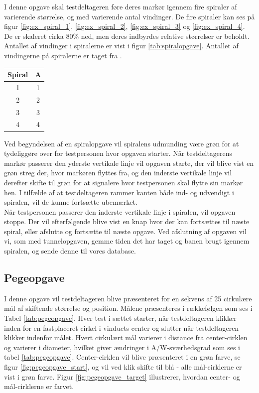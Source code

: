 I denne opgave skal testdeltageren føre deres markør igennem fire spiraler af varierende størrelse, og med varierende antal vindinger. De fire spiraler kan ses på figur \ref{fig:ex_spiral_1}, \ref{fig:ex_spiral_2}, \ref{fig:ex_spiral_3} og \ref{fig:ex_spiral_4}. De er skaleret cirka 80\% ned, men deres indbyrdes relative størrelser er beholdt. Antallet af vindinger i spiralerne er vist i figur \ref{tab:spiralopgave}. Antallet af vindingerne på spiralerne er taget fra \cite{accot1997}.
\begin{center}
	\begin{tabular}{c c}
		Spiral & A \\
		\hline
		1 & 1 \\
		2 & 2 \\
		3 & 3 \\
		4 & 4 \\
	\end{tabular}
	\label{tab:spiralopgave}
\end{center}
Ved begyndelsen af en spiralopgave vil spiralens udmunding være grøn for at tydeliggøre over for testpersonen hvor opgaven starter. Når testdeltagerens markør passerer den yderste vertikale linje vil opgaven starte, der vil blive vist en grøn streg der, hvor markøren flyttes fra, og den inderste vertikale linje vil derefter skifte til grøn for at signalere hvor testpersonen skal flytte sin markør hen. I tilfælde af at testdeltageren rammer kanten både ind- og udvendigt i spiralen, vil de kunne fortsætte ubemærket.\\
Når testpersonen passerer den inderste vertikale linje i spiralen, vil opgaven stoppe. Der vil efterfølgende blive vist en knap hvor der kan fortsættes til næste spiral, eller afslutte og fortsætte til næste opgave. Ved afslutning af opgaven vil vi, som med tunnelopgaven, gemme tiden det har taget og banen brugt igennem spiralen, og sende denne til vores database.

\subsection*{Pegeopgave}
I denne opgave vil testdeltageren blive præsenteret for en sekvens af 25 cirkulære mål af skiftende størrelse og position. Målene præsenteres i rækkefølgen som ses i Tabel \ref{tab:pegeopgave}. Hver test i sættet starter, når testdeltageren klikker inden for en fastplaceret cirkel i vinduets center og slutter når testdeltageren klikker indenfor målet. Hvert cirkulært mål varierer i distance fra center-cirklen og varierer i diameter, hvilket giver ændringer i A/W-sværhedsgrad som ses i tabel \ref{tab:pegeopgave}. Center-cirklen vil blive præsenteret i en grøn farve, se figur \ref{fig:pegeopgave_start}, og vil ved klik skifte til blå - alle mål-cirklerne er vist i grøn farve. Figur \ref{fig:pegeopgave_target} illustrerer, hvordan center- og mål-cirklerne er farvet. 

